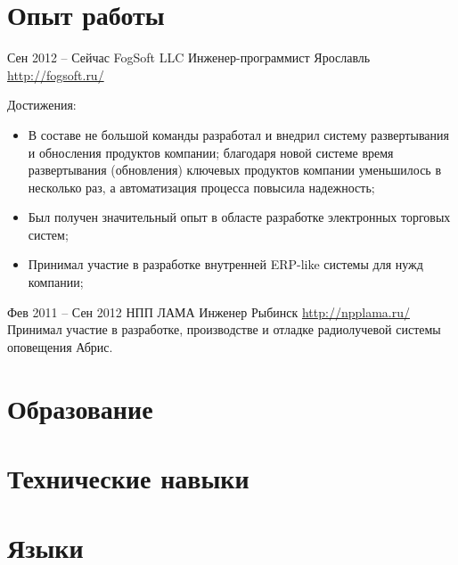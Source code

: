 \documentclass[11pt,a4paper,sans]{moderncv}
\begin{document}
    \makecvtitle
    
    \section{Опыт работы}
    \cventry
      {Сен 2012 -- Сейчас}
      {FogSoft LLC}
      {Инженер-программист}
      {Ярославль}
      {\newline{}\url{http://fogsoft.ru/}}
      {Достижения:%
    \begin{itemize}%
    \item В составе не большой команды разработал и внедрил систему развертывания и обносления продуктов компании; благодаря новой системе время развертывания (обновления) ключевых продуктов компании уменьшилось в несколько раз, а автоматизация процесса повысила надежность;
    \item Был получен значительный опыт в областе разработке электронных торговых систем;
    \item Принимал участие в разработке внутренней ERP-like системы для нужд компании;
    \end{itemize}}
    \cventry
      {Фев 2011 -- Сен 2012}
      {НПП ЛАМА}
      {Инженер}
      {Рыбинск}
      {\newline{}\url{http://npplama.ru/}}
      {Принимал участие в разработке, производстве и отладке радиолучевой системы оповещения Абрис.}
      
    \section{Образование}
    
    \section{Технические навыки}
    
    \section{Языки}
    
\end{document}
